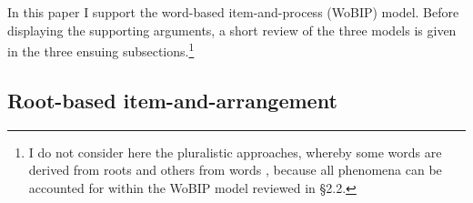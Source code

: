 \documentclass[output=paper,
modfonts
]{LSP/langsci}
\begin{document}
	
	In this paper I support the word-based item-and-process (WoBIP) model.
	Before displaying the supporting arguments, a short review of the three
	models is given in the three ensuing subsections.\footnote{I do not consider here the pluralistic approaches, whereby some words
  are derived from roots and others from words \citep{McCarthy1979a,arad2005a,berman2012a}, because all phenomena can be accounted for within
  the WoBIP model reviewed in §2.2.}

\subsection{Root-based item-and-arrangement}\label{root-based-item-and-arrangement}
\end{document}
